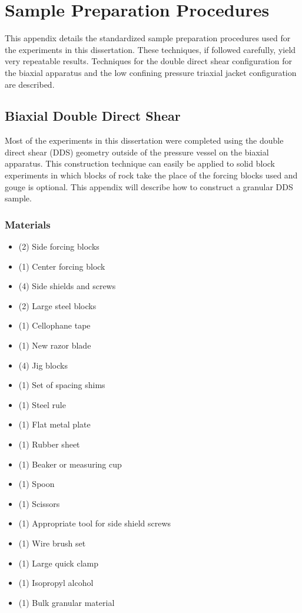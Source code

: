 \chapter{Sample Preparation Procedures}

This appendix details the standardized sample preparation procedures used for the experiments in this dissertation. These techniques, if followed carefully, yield very repeatable results. Techniques for the double direct shear configuration for the biaxial apparatus and the low confining pressure triaxial jacket configuration are described.

\section{Biaxial Double Direct Shear}

Most of the experiments in this dissertation were completed using the double direct shear (DDS) geometry outside of the pressure vessel on the biaxial apparatus. This construction technique can easily be applied to solid block experiments in which blocks of rock take the place of the forcing blocks used and gouge is optional. This appendix will describe how to construct a granular DDS sample.

\subsection{Materials}
\begin{itemize}
\item (2) Side forcing blocks
\item (1) Center forcing block
\item (4) Side shields and screws
\item (2) Large steel blocks
\item (1) Cellophane tape
\item (1) New razor blade
\item (4) Jig blocks
\item (1) Set of spacing shims
\item (1) Steel rule
\item (1) Flat metal plate
\item (1) Rubber sheet
\item (1) Beaker or measuring cup
\item (1) Spoon
\item (1) Scissors
\item (1) Appropriate tool for side shield screws
\item (1) Wire brush set
\item (1) Large quick clamp
\item (1) Isopropyl alcohol
\item (1) Bulk granular material
\end{itemize}

